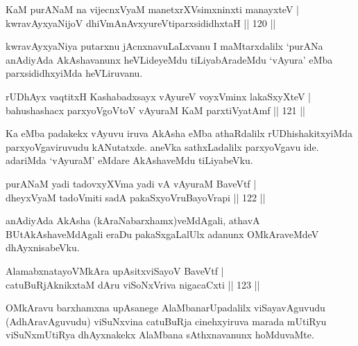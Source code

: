 
\begin{shl}
KaM purANaM na vijecnxVyaM manetxrXV\s simxninxti manayxteV  | \\
kwravAyxyaNijoV dhiVmAnAvxyureVtiparxsididhxtaH \hfill||  120 ||  
\end{shl}

\begin{artha}
kwravAyxyaNiya putarxnu jAcnxnavuLaLxvanu I maMtarxdalilx `purANa anAdiyAda AkAshavanunx heVLideyeMdu tiLiyabAradeMdu `vAyura' eMba parxsididhxyiMda heVLiruvanu.
\end{artha}


\begin{shl}
rUDhAyx vaqtitxH Kashabadxsayx vAyureV voyxVminx lakaSxyXteV  | \\
bahushashacx parxyoVgoV\s toV vAyuraM KaM parxtiVyatAmf \hfill||  121 ||  
\end{shl}

\begin{artha}
Ka eMba padakekx vAyuvu iruva AkAsha eMba athaRdalilx rUDhishakitxyiMda parxyoVgaviruvudu kANutatxde. aneVka sathxLadalilx parxyoVgavu ide. adariMda `vAyuraM' eMdare AkAshaveMdu tiLiyabeVku.
\end{artha}


\begin{shl}
purANaM yadi tadovxyXVma yadi vA vAyuraM BaveVtf  | \\
dheyxVyaM tadoVmiti sadA pakaSxyoVruBayoVrapi \hfill||  122 ||  
\end{shl}

\begin{artha}
anAdiyAda AkAsha (kAraNabarxhamx)veMdAgali, athavA BUtAkAshaveMdAgali eraDu pakaSxgaLalUlx adanunx OMkAraveMdeV dhAyxnisabeVku.
\end{artha}

\begin{shl}
AlamabxnatayoVMkAra upAsitxviSayoV BaveVtf  | \\
catuBuRjAknikxtaM dAru viSoNxVriva nigacaCxti \hfill||  123 ||  
\end{shl}

\begin{artha}
OMkAravu barxhamxna upAsanege AlaMbanarUpadalilx viSayavAguvudu (AdhAravAguvudu) viSuNxvina catuBuRja cinehxyiruva marada mUtiRyu viSuNxmUtiRya dhAyxnakekx AlaMbana sAthxnavanunx hoMduvaMte.
\end{artha}

